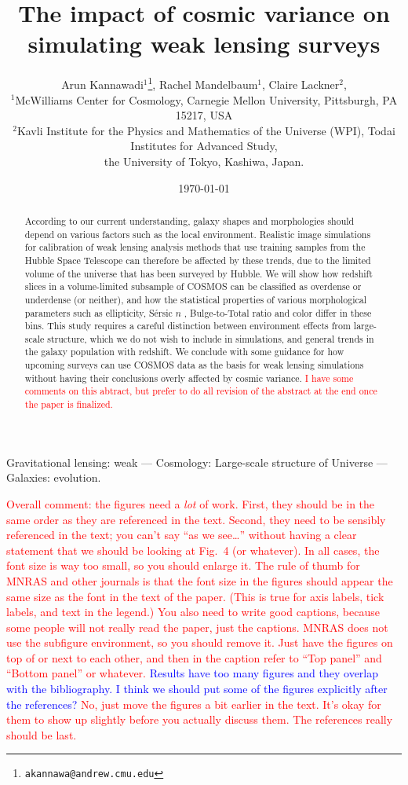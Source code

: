 \documentclass[twocolumn,useAMS,usenatbib]{mn2e}
\title[WL simulation]{The impact of cosmic variance on simulating weak lensing surveys}
\author[Kannawadi et al.]
{Arun Kannawadi$^1$\thanks{\tt akannawa@andrew.cmu.edu}, 
Rachel Mandelbaum$^1$,
Claire Lackner$^2$, 
\\$^1$McWilliams Center for Cosmology, Carnegie Mellon University, Pittsburgh, PA 15217, USA
\\$^2$Kavli Institute for the Physics and Mathematics of the Universe (WPI), Todai Institutes for Advanced Study,\\ the University of Tokyo, Kashiwa, Japan.
}
\date{\today}
\newcommand{\rachel}[1]{{\textcolor{red}{#1}}}
\newcommand{\arun}[1]{{\textcolor{blue}{#1}}}
\newcommand{\sersicn}{S\'{e}rsic $n$ }
\newcommand{\btt}{Bulge-to-Total }
\begin{document}

\maketitle

\begin{abstract}
According to our current understanding, galaxy shapes and morphologies should depend on various factors such as the local environment. Realistic image simulations for calibration of weak lensing analysis methods that use training samples from the Hubble Space Telescope can therefore be affected by these trends, due to the limited volume of the universe that has been surveyed by Hubble. We will show how redshift slices in a volume-limited subsample of COSMOS can be classified as overdense or underdense (or neither), and how the statistical properties of various morphological parameters such as ellipticity, \sersicn, \btt ratio and color differ in these bins. This study requires a careful distinction between environment effects from large-scale structure, which we do not wish to include in simulations, and general trends in the galaxy population with redshift. We conclude with some guidance for how upcoming surveys can use COSMOS data as the basis for weak lensing simulations without having their conclusions overly affected by cosmic variance.  
\rachel{I have some comments on this abtract, but prefer to do all
  revision of the abstract at the end once the paper is finalized.}
\end{abstract}

\begin{keywords}
 Gravitational lensing: weak --- Cosmology: Large-scale structure of Universe --- Galaxies: evolution.
\end{keywords}

\rachel{Overall comment: the figures need a {\em lot} of work.  First,
  they should be in the same order as they are referenced in the
  text.  Second, they need to be sensibly referenced in the text; you
  can't say ``as we see\dots'' without having a clear statement that
  we should be looking at Fig.~4 (or whatever).  In all
  cases, the font size is way too small, so you should enlarge it.
  The rule of thumb for MNRAS and other journals is that the font size
  in the figures should appear the same size as the font in the text
  of the paper.  (This is true for axis labels, tick labels, and text
  in the legend.)  You also need to write good captions, because some
  people will not really read the paper, just the captions.  MNRAS
  does not use the subfigure environment, so you should remove it.
  Just have the figures on top of or next to each other, and then in
  the caption refer to ``Top panel'' and ``Bottom panel'' or whatever.}
\arun{Results have too many figures and they overlap with the bibliography. I think we should put some of the figures explicitly after the references?}
\rachel{No, just move the figures a bit earlier in the text.  It's okay for them to show up slightly before you actually discuss them.  The references really should be last.}
\end{document}
